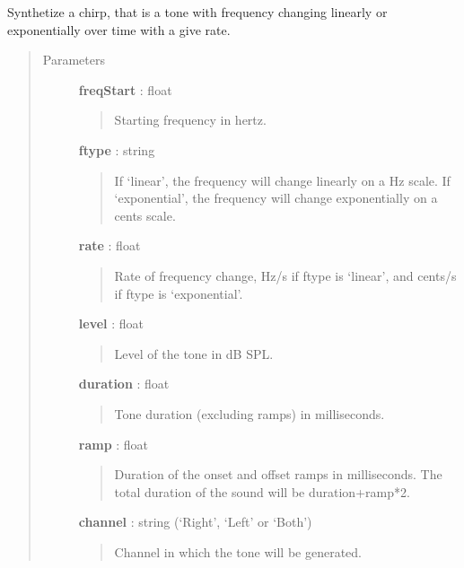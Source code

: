 \documentclass[a4paper,12pt,english]{sphinxmanual}
\begin{document}
\begin{fulllineitems}
\label{sndlib:sndlib.chirp}
Synthetize a chirp, that is a tone with frequency changing linearly or
exponentially over time with a give rate.
\begin{quote}\begin{description}
\item[{Parameters }] \leavevmode
\textbf{freqStart} : float
\begin{quote}

Starting frequency in hertz.
\end{quote}

\textbf{ftype} : string
\begin{quote}

If `linear', the frequency will change linearly on a Hz scale.
If `exponential', the frequency will change exponentially on a cents scale.
\end{quote}

\textbf{rate} : float
\begin{quote}

Rate of frequency change, Hz/s if ftype is `linear',
and cents/s if ftype is `exponential'.
\end{quote}

\textbf{level} : float
\begin{quote}

Level of the tone in dB SPL.
\end{quote}

\textbf{duration} : float
\begin{quote}

Tone duration (excluding ramps) in milliseconds.
\end{quote}

\textbf{ramp} : float
\begin{quote}

Duration of the onset and offset ramps in milliseconds.
The total duration of the sound will be duration+ramp*2.
\end{quote}

\textbf{channel} : string (`Right', `Left' or `Both')
\begin{quote}

Channel in which the tone will be generated.
\end{quote}


\end{description}
\end{quote}
\end{fulllineitems}
\end{document}
